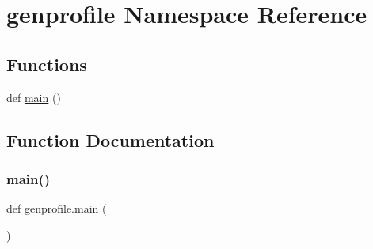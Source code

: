 \hypertarget{namespacegenprofile}{}\section{genprofile Namespace Reference}
\label{namespacegenprofile}
\subsection*{Functions}
\begin{DoxyCompactItemize}
\item 
def \hyperlink{namespacegenprofile_a5b6f3672aa0e92637f95736d1d775d61}{main} ()
\end{DoxyCompactItemize}


\subsection{Function Documentation}
\mbox{\label{namespacegenprofile_a5b6f3672aa0e92637f95736d1d775d61}} 
\subsubsection{\texorpdfstring{main()}{main()}}
{\footnotesize\ttfamily def genprofile.\+main (\begin{DoxyParamCaption}{ }\end{DoxyParamCaption})}

